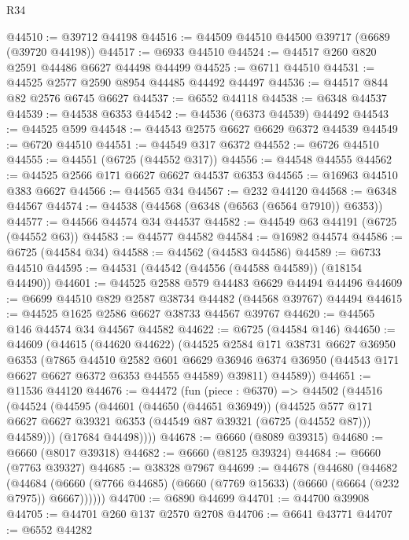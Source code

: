 \begin{lexlean}{R34}
\begin{coremodule}
@44510 := @39712 @44198
@44516 := @44509 @44510 @44500 @39717 (@6689 (@39720 @44198))
@44517 := @6933 @44510
@44524 := @44517 @260 @820 @2591 @44486 @6627 @44498 @44499
@44525 := @6711 @44510
@44531 := @44525 @2577 @2590 @8954 @44485 @44492 @44497
@44536 := @44517 @844 @82 @2576 @6745 @6627
@44537 := @6552 @44118
@44538 := @6348 @44537
@44539 := @44538 @6353
@44542 := @44536 (@6373 @44539) @44492
@44543 := @44525 @599
@44548 := @44543 @2575 @6627 @6629 @6372 @44539
@44549 := @6720 @44510
@44551 := @44549 @317 @6372
@44552 := @6726 @44510
@44555 := @44551 (@6725 (@44552 @317))
@44556 := @44548 @44555
@44562 := @44525 @2566 @171 @6627 @6627 @44537 @6353
@44565 := @16963 @44510 @383 @6627
@44566 := @44565 @34
@44567 := @232 @44120
@44568 := @6348 @44567
@44574 := @44538 (@44568 (@6348 (@6563 (@6564 @7910)) @6353))
@44577 := @44566 @44574 @34 @44537
@44582 := @44549 @63 @44191 (@6725 (@44552 @63))
@44583 := @44577 @44582
@44584 := @16982 @44574
@44586 := @6725 (@44584 @34)
@44588 := @44562 (@44583 @44586)
@44589 := @6733 @44510
@44595 := @44531 (@44542 (@44556 (@44588 @44589)) (@18154 @44490))
@44601 := @44525 @2588 @579 @44483 @6629 @44494 @44496
@44609 := @6699 @44510 @829 @2587 @38734 @44482 (@44568 @39767) @44494
@44615 := @44525 @1625 @2586 @6627 @38733 @44567 @39767
@44620 := @44565 @146 @44574 @34 @44567 @44582
@44622 := @6725 (@44584 @146)
@44650 := @44609
    (@44615
      (@44620 @44622)
      (@44525
        @2584
        @171
        @38731
        @6627
        @36950
        @6353
        (@7865
          @44510
          @2582
          @601
          @6629
          @36946
          @6374
          @36950
          (@44543 @171 @6627 @6627 @6372 @6353 @44555 @44589)
          @39811)
        @44589))
@44651 := @11536 @44120
@44676 := @44472
    (fun (piece : @6370) =>
    @44502
      (@44516
        (@44524
          (@44595
            (@44601
              (@44650 (@44651 @36949))
              (@44525
                @577
                @171
                @6627
                @6627
                @39321
                @6353
                (@44549 @87 @39321 (@6725 (@44552 @87)))
                @44589)))
          (@17684 @44498))))
@44678 := @6660 (@8089 @39315)
@44680 := @6660 (@8017 @39318)
@44682 := @6660 (@8125 @39324)
@44684 := @6660 (@7763 @39327)
@44685 := @38328 @7967
@44699 := @44678
    (@44680
      (@44682
        (@44684 (@6660 (@7766 @44685) (@6660 (@7769 @15633) (@6660 (@6664 (@232 @7975)) @6667))))))
@44700 := @6890 @44699
@44701 := @44700 @39908
@44705 := @44701 @260 @137 @2570 @2708
@44706 := @6641 @43771
@44707 := @6552 @44282

\end{coremodule}
\end{lexlean}
